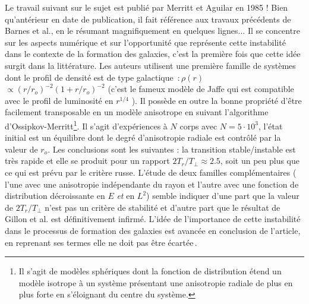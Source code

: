 Le travail suivant sur le sujet est publi\'{e} par Merritt et Aguilar
en 1985 \cite{merritt_aguilar}! Bien qu'ant\'{e}rieur en date de publication, il fait
r\'{e}f\'{e}rence aux travaux pr\'{e}c\'{e}dents de Barnes et al., en le
r\'{e}sumant magnifiquement en quelques lignes... Il se concentre sur les
aspects num\'{e}rique et sur l'opportunit\'{e} que repr\'{e}sente cette
instabilit\'{e} dans le contexte de la formation des galaxies, c'est la
premi\`{e}re fois que cette id\'{e}e surgit dans la litt\'{e}rature. Les auteurs
utilisent une premi\`{e}re famille de syst\`{e}mes dont le profil de
densit\'{e} est \og de type galactique\fg\, $:\rho\left(  r\right)  $ $\propto
(r/r_{o})^{-2}(1+r/r_{o})^{-2}$ (c'est le fameux mod\`{e}le de Jaffe qui
est compatible avec le profil de luminosit\'{e} en $r^{1/4}$ ). Il poss\`{e}de
en outre la bonne propri\'{e}t\'{e} d'\^{e}tre facilement transposable en un
mod\`{e}le anisotrope en suivant l'algorithme
d'Ossipkov-Merritt\footnote{Il s'agit de modèles sphériques dont la fonction de distribution étend un modèle isotrope à un système présentant une anisotropie radiale de plus en plus forte en s'éloignant du centre du système.}. Il s'agit d'exp\'{e}riences \`{a}
$N$ corps avec $N=5\cdot10^{3}$, l'\'{e}tat initial est un \'{e}quilibre
dont le degr\'{e} d'anisotropie radiale est contr\^{o}l\'{e}
par la valeur de $r_{o}$. Les conclusions sont les suivantes : la
transition stable/instable est tr\`{e}s rapide et elle se produit pour un
rapport $2T_{r}/T_{\perp}\approx2.5$, soit un peu plus que ce qui est
pr\'{e}vu par le crit\`{e}re russe. L'\'{e}tude de deux familles
compl\'{e}mentaires ( l'une avec une anisotropie ind\'{e}pendante du rayon et
l'autre avec une fonction de distribution d\'{e}croissante en $E$
\emph{et} en $L^{2}$) semble indiquer d'une part que la valeur de
$2T_{r}/T_{\perp}$ n'est pas un crit\`{e}re de stabilit\'{e} et d'autre part
que le r\'{e}sultat \cite{waterbag} de Gillon et al. est d\'{e}finitivement
infirm\'{e}. L'id\'{e}e de l'importance de cette instabilit\'{e} dans le
processus de formation des galaxies est avanc\'{e}e en conclusion de l'article, en reprenant ses termes \og elle ne doit pas \^{e}tre \'{e}cart\'{e}e\fg\,.

